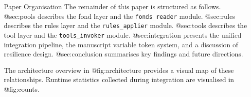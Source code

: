 \documentclass[
  ignorenonframetext,
]{beamer}
\begin{document}
\begin{frame}{Paper Organisation}
\protect{}\label{paper-organisation}
The remainder of this paper is structured as follows. @sec:pools
describes the fond layer and the \texttt{fonds\_reader} module.
@sec:rules describes the rules layer and the \texttt{rules\_applier}
module. @sec:tools describes the tool layer and the
\texttt{tools\_invoker} module. @sec:integration presents the unified
integration pipeline, the manuscript variable token system, and a
discussion of resilience design. @sec:conclusion summarises key findings
and future directions.

The architecture overview in @fig:architecture provides a visual map of
these relationships. Runtime statistics collected during integration are
visualised in @fig:counts.
\end{frame}
\end{document}
